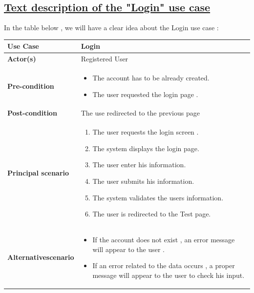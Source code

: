 \newpage
\subsection*{\textbf{\underline{Text description of the "Login" use case}}}

\vspace{0.25cm}
In the table below , we will have a clear idea about the Login use case : 

\begin{table}[H]
    \renewcommand{\arraystretch}{1.5}
    
   \begin{tabular}{|p{}|p{}|}
   \hline
     
        \textbf{Use Case} & Login  \\   \hline
        
        \textbf{Actor(s) } & Registered User  \\   \hline
        \textbf{Pre-condition} &  
        \begin{itemize}[left=0pt]
             \renewcommand\labelitemi{\textbf{\Huge .}}
             
            \item The account has to be already created.
            \item The user requested the login page .
        \end{itemize} \\   \hline
        \textbf{Post-condition} & The use redirected to the previous page  \\  \hline
                \textbf{Principal scenario} & 
                \begin{enumerate}[left=0pt]
                \item The user requests the login screen .
                \item The system displays the login page.
                \item The user enter his information.
                \item The user submits his information.
                \item The system validates the users information.
                \item The user is redirected to the Test page.
                \end{enumerate}  \\   \hline                 
          \textbf{Alternative\newline scenario} & 
        \begin{itemize}[left=0pt]
             \renewcommand\labelitemi{\textbf{\Huge .}}
            \item If the account  does not exist , an error  message will appear to the user .
            \item If an error related to the data occurs , a proper message will appear to the user to check his input.
        \end{itemize} \\   \hline


\end{tabular}
\end{table}
